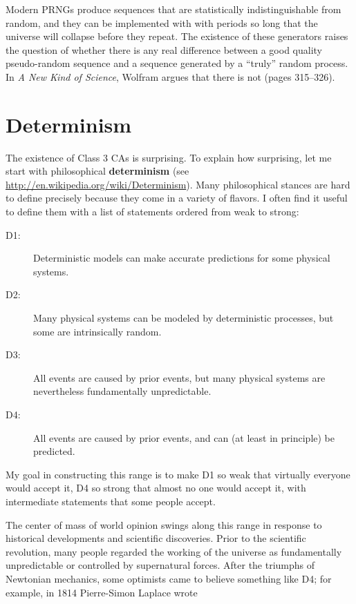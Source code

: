 \documentclass[12pt]{book}
\theoremstyle{exercise}
\begin{document}
Modern PRNGs produce sequences that are statistically
indistinguishable from random, and they can be implemented with with
periods so long that the universe will collapse before they repeat.
The existence of these generators raises the question of whether there
is any real difference between a good quality pseudo-random sequence
and a sequence generated by a ``truly'' random process.  In {\em A New
  Kind of Science}, Wolfram argues that there is not (pages 315--326).


\section{Determinism}
\label{determinism}

The existence of Class 3 CAs is surprising.  To explain how
surprising, let me start with philosophical
{\bf determinism} (see \url{http://en.wikipedia.org/wiki/Determinism}).
Many philosophical stances are hard to define precisely because
they come in a variety of flavors.  I often find it useful
to define them with a list of statements ordered from weak
to strong:

\begin{description}

\item[D1:] Deterministic models can make accurate predictions
for some physical systems.

\item[D2:] Many physical systems can be modeled by deterministic
processes, but some are intrinsically random.

\item[D3:] All events are caused by prior events, but many
physical systems are nevertheless fundamentally unpredictable.

\item[D4:] All events are caused by prior events, and can (at
least in principle) be predicted.


\end{description}

My goal in constructing this range is to make D1 so weak that
virtually everyone would accept it, D4 so strong that almost no one
would accept it, with intermediate statements that some people accept.

The center of mass of world opinion swings along this range in
response to historical developments and scientific discoveries.  Prior
to the scientific revolution, many people regarded the working of the
universe as fundamentally unpredictable or controlled by supernatural
forces.  After the triumphs of Newtonian mechanics, some optimists
came to believe something like D4; for example, in 1814 Pierre-Simon
Laplace wrote
\end{document}
